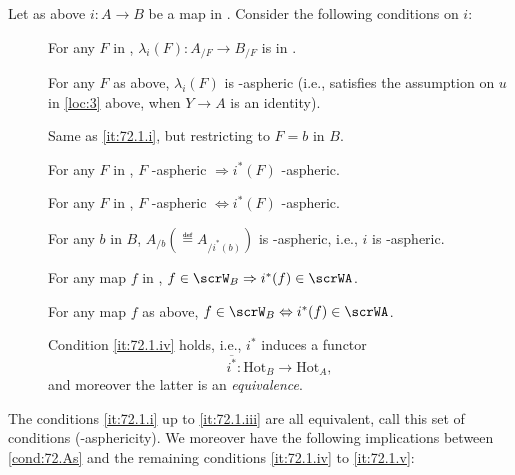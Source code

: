 \begin{propositionnum}\label{prop:72.1}
  Let as above $i:A\to B$ be a map in \Cat. Consider the following
  conditions on $i$:
  \begin{description}
  \item[]
    For any $F$ in \Bhat, $\lambda_i(F): A_{/F} \to B_{/F}$ is in \scrW.
  \item[]
    For any $F$ as above, $\lambda_i(F)$ is \scrW-aspheric
    \textup(i.e., satisfies the assumption on $u$ in
    \textup{\ref{loc:3}} above, when $Y\to A$ is an identity\textup).
  \item[]
    Same as \textup{\ref{it:72.1.i}}, but restricting to $F=b$ in $B$.
  \item[]
    For any $F$ in \Bhat, $F$ \scrW-aspheric $\Rightarrow i^*(F)$
    \scrW-aspheric.
  \item[]
    For any $F$ in \Bhat, $F$ \scrW-aspheric $\Leftrightarrow i^*(F)$
    \scrW-aspheric.
  \item[]
    For any $b$ in $B$, $A_{/b} (\eqdef A_{/i^*(b)})$ is
    \scrW-aspheric, i.e., $i$ is \scrW-aspheric.
  \item[]
    For any map $f$ in \Bhat, $f\in\scrW_B \Rightarrow i^*(f)\in\scrWA$.
  \item[]
    For any map $f$ as above, $f\in\scrW_B \Leftrightarrow i^*(f)\in\scrWA$.
  \item[]
    Condition \textup{\ref{it:72.1.iv}} holds, i.e., $i^*$ induces a
    functor
    \[\overline{i^*} : \mathrm{Hot}_B \to \mathrm{Hot}_A,\]
    and moreover the latter is an \emph{equivalence}.
  \end{description}
  The conditions \textup{\ref{it:72.1.i}} up to
  \textup{\ref{it:72.1.iii}} are all equivalent, call this set of
  conditions \textup{}
  \textup(\scrW-asphericity\textup). We moreover have the following
  implications between \textup{\ref{cond:72.As}} and the remaining
  conditions \textup{\ref{it:72.1.iv}} to \textup{\ref{it:72.1.v}}:
  \begin{equation}
    \label{eq:72.1.star}
    \begin{tabular}{@{}c@{}}
      \begin{tikzcd}[baseline=(O.base),math mode=false,%
        arrows=Rightarrow,column sep=-3pt]

\end{tikzcd}
\end{tabular}
\end{equation}
\end{propositionnum}
